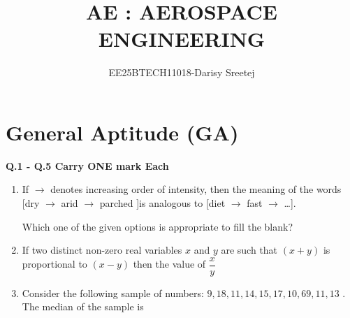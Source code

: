 \documentclass[journal,12pt,onecolumn]{IEEEtran}
\title{ AE : AEROSPACE ENGINEERING}
\author{EE25BTECH11018-Darisy Sreetej}
\theoremstyle{remark}
\begin{document}
\maketitle

\section{General Aptitude (GA)}
\textbf{Q.1 - Q.5 Carry ONE mark Each}

\begin{enumerate}
    \item   
If $\rightarrow$ denotes increasing order of intensity, then the meaning of the words  
[dry $\rightarrow$ arid $\rightarrow$ parched ]is analogous to [diet $\rightarrow$ fast $\rightarrow$ \dots].  

Which one of the given options is appropriate to fill the blank?  
\begin{enumerate}
\end{enumerate}

\item 
If two distinct non-zero real variables $x$ and $y$ are such that $(x+y)$ is proportional to $(x-y)$ then the value of $\dfrac{x}{y}$  
\begin{enumerate}
\end{enumerate}

\item
Consider the following sample of numbers: $9, 18, 11, 14, 15, 17, 10, 69, 11, 13$ . The median of the sample is  
\begin{enumerate}
\end{enumerate}
  

\end{enumerate}
\end{document}
